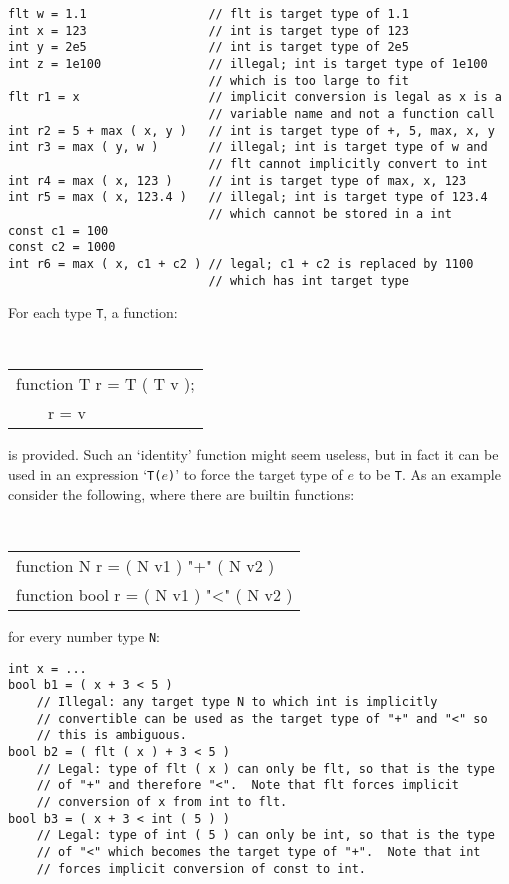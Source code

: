 \documentclass[12pt]{article}
\newenvironment{indpar}[1][0.3in]%
	{\begin{list}{}%
		     {\setlength{\itemsep}{0in}%
		      \setlength{\topsep}{0in}%
		      \setlength{\parsep}{1ex}%
		      \setlength{\labelwidth}{#1}%
		      \setlength{\leftmargin}{#1}%
		      \addtolength{\leftmargin}{\labelsep}}%
	 \item}%
	{\end{list}}
\begin{document}
\begin{indpar}\begin{verbatim}
flt w = 1.1                 // flt is target type of 1.1
int x = 123                 // int is target type of 123
int y = 2e5                 // int is target type of 2e5
int z = 1e100               // illegal; int is target type of 1e100
                            // which is too large to fit
flt r1 = x                  // implicit conversion is legal as x is a
                            // variable name and not a function call
int r2 = 5 + max ( x, y )   // int is target type of +, 5, max, x, y
int r3 = max ( y, w )       // illegal; int is target type of w and
                            // flt cannot implicitly convert to int
int r4 = max ( x, 123 )     // int is target type of max, x, 123
int r5 = max ( x, 123.4 )   // illegal; int is target type of 123.4
                            // which cannot be stored in a int
const c1 = 100
const c2 = 1000
int r6 = max ( x, c1 + c2 ) // legal; c1 + c2 is replaced by 1100
                            // which has int target type
\end{verbatim}\end{indpar}

For each type {\tt T}, a function:
\begin{center} \tt
\begin{tabular}{l}
function T r = T ( T v ); \\
~~~~r = v
\end{tabular}
\end{center}
is provided.  Such an `identity' function might seem useless,
but in fact it can be used in an expression `{\tt T($e$)}' to
force the target type of $e$ to be {\tt T}.  As an example
consider the following, where there are builtin functions:
\begin{center} \tt
\begin{tabular}{l}
function N r = ( N v1 ) "+" ( N v2 ) \\
function bool r = ( N v1 ) "<" ( N v2 ) \\
\end{tabular}
\end{center}
for every number type {\tt N}:

\begin{indpar}\begin{verbatim}
int x = ...
bool b1 = ( x + 3 < 5 )
    // Illegal: any target type N to which int is implicitly
    // convertible can be used as the target type of "+" and "<" so
    // this is ambiguous.
bool b2 = ( flt ( x ) + 3 < 5 )
    // Legal: type of flt ( x ) can only be flt, so that is the type
    // of "+" and therefore "<".  Note that flt forces implicit
    // conversion of x from int to flt.
bool b3 = ( x + 3 < int ( 5 ) )
    // Legal: type of int ( 5 ) can only be int, so that is the type
    // of "<" which becomes the target type of "+".  Note that int
    // forces implicit conversion of const to int.
\end{verbatim}\end{indpar}
\end{document}
